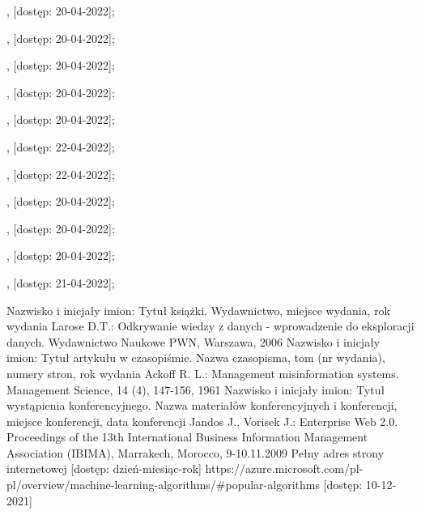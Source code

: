 \begin{thebibliography}{999}
,
 [dostęp: 20-04-2022];

,
 [dostęp: 20-04-2022];

,
 [dostęp: 20-04-2022];

,
 [dostęp: 20-04-2022];

,
 [dostęp: 20-04-2022];

,
 [dostęp: 22-04-2022];

,
 [dostęp: 22-04-2022];

,
 [dostęp: 20-04-2022];

,
 [dostęp: 20-04-2022];

,
 [dostęp: 20-04-2022];

,
 [dostęp: 21-04-2022];

Nazwisko i inicjały imion: Tytuł książki. Wydawnictwo, miejsce wydania, rok wydania
	Larose D.T.: Odkrywanie wiedzy z danych - wprowadzenie do eksploracji danych. Wydawnictwo Naukowe PWN, Warszawa, 2006
Nazwisko i inicjały imion: Tytuł artykułu w czasopiśmie. Nazwa czasopisma, tom (nr wydania), numery stron, rok wydania
 Ackoff R. L.: Management misinformation systems. Management Science, 14 (4), 147-156, 1961
Nazwisko i inicjały imion: Tytuł wystąpienia konferencyjnego. Nazwa materiałów konferencyjnych i konferencji, miejsce konferencji, data konferencji
Jandos J., Vorisek J.: Enterprise Web 2.0. Proceedings of the 13th International Business Information Management Association (IBIMA), Marrakech, Morocco, 9-10.11.2009
	Pełny adres strony internetowej [dostęp: dzień-miesiąc-rok]
	https://azure.microsoft.com/pl-pl/overview/machine-learning-algorithms/\#popular-algorithms [dostęp: 10-12-2021]


\end{thebibliography}

